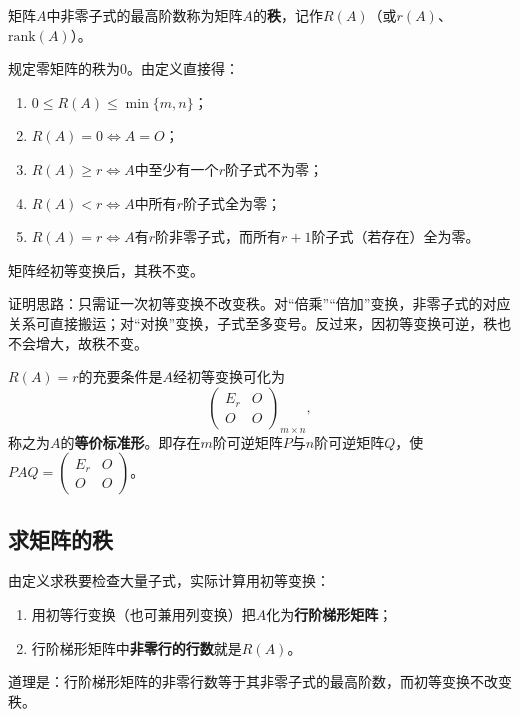 \begin{definition}
矩阵$A$中非零子式的最高阶数称为矩阵$A$的\textbf{秩}，记作$R(A)$（或$r(A)$、$\mathrm{rank}(A)$）。
\end{definition}

规定零矩阵的秩为$0$。由定义直接得：
\begin{enumerate}
\item $0\le R(A)\le\min\{m,n\}$；
\item $R(A)=0\iff A=O$；
\item $R(A)\ge r\iff A$中至少有一个$r$阶子式不为零；
\item $R(A)<r\iff A$中所有$r$阶子式全为零；
\item $R(A)=r\iff A$有$r$阶非零子式，而所有$r+1$阶子式（若存在）全为零。
\end{enumerate}

\begin{theorem}
矩阵经初等变换后，其秩不变。
\end{theorem}

证明思路：只需证一次初等变换不改变秩。对“倍乘”“倍加”变换，非零子式的对应关系可直接搬运；对“对换”变换，子式至多变号。反过来，因初等变换可逆，秩也不会增大，故秩不变。

\begin{corollary}
$R(A)=r$的充要条件是$A$经初等变换可化为
\[
\begin{pmatrix}E_r&O\\O&O\end{pmatrix}_{m\times n},
\]
称之为$A$的\textbf{等价标准形}。即存在$m$阶可逆矩阵$P$与$n$阶可逆矩阵$Q$，使$PAQ=\begin{pmatrix}E_r&O\\O&O\end{pmatrix}$。
\end{corollary}

\subsection{求矩阵的秩}

由定义求秩要检查大量子式，实际计算用初等变换：

\begin{enumerate}
\item 用初等行变换（也可兼用列变换）把$A$化为\textbf{行阶梯形矩阵}；
\item 行阶梯形矩阵中\textbf{非零行的行数}就是$R(A)$。
\end{enumerate}

道理是：行阶梯形矩阵的非零行数等于其非零子式的最高阶数，而初等变换不改变秩。

